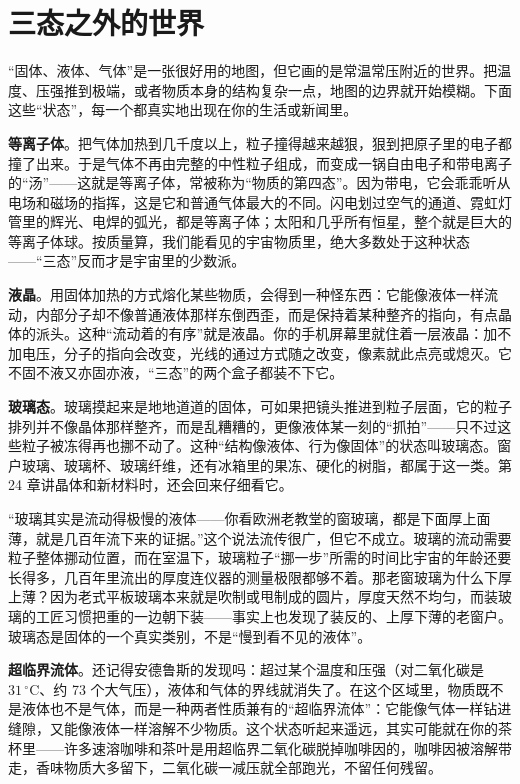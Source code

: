 \section{三态之外的世界}

“固体、液体、气体”是一张很好用的地图，但它画的是常温常压附近的世界。把温度、压强推到极端，或者物质本身的结构复杂一点，地图的边界就开始模糊。下面这些“状态”，每一个都真实地出现在你的生活或新闻里。

\textbf{等离子体}。把气体加热到几千度以上，粒子撞得越来越狠，狠到把原子里的电子都撞了出来。于是气体不再由完整的中性粒子组成，而变成一锅自由电子和带电离子的“汤”——这就是等离子体，常被称为“物质的第四态”。因为带电，它会乖乖听从电场和磁场的指挥，这是它和普通气体最大的不同。闪电划过空气的通道、霓虹灯管里的辉光、电焊的弧光，都是等离子体；太阳和几乎所有恒星，整个就是巨大的等离子体球。按质量算，我们能看见的宇宙物质里，绝大多数处于这种状态——“三态”反而才是宇宙里的少数派。

\textbf{液晶}。用固体加热的方式熔化某些物质，会得到一种怪东西：它能像液体一样流动，内部分子却不像普通液体那样东倒西歪，而是保持着某种整齐的指向，有点晶体的派头。这种“流动着的有序”就是液晶。你的手机屏幕里就住着一层液晶：加不加电压，分子的指向会改变，光线的通过方式随之改变，像素就此点亮或熄灭。它不固不液又亦固亦液，“三态”的两个盒子都装不下它。

\textbf{玻璃态}。玻璃摸起来是地地道道的固体，可如果把镜头推进到粒子层面，它的粒子排列并不像晶体那样整齐，而是乱糟糟的，更像液体某一刻的“抓拍”——只不过这些粒子被冻得再也挪不动了。这种“结构像液体、行为像固体”的状态叫玻璃态。窗户玻璃、玻璃杯、玻璃纤维，还有冰箱里的果冻、硬化的树脂，都属于这一类。第 24 章讲晶体和新材料时，还会回来仔细看它。

\begin{wuqu}
“玻璃其实是流动得极慢的液体——你看欧洲老教堂的窗玻璃，都是下面厚上面薄，就是几百年流下来的证据。”这个说法流传很广，但它不成立。玻璃的流动需要粒子整体挪动位置，而在室温下，玻璃粒子“挪一步”所需的时间比宇宙的年龄还要长得多，几百年里流出的厚度连仪器的测量极限都够不着。那老窗玻璃为什么下厚上薄？因为老式平板玻璃本来就是吹制或甩制成的圆片，厚度天然不均匀，而装玻璃的工匠习惯把重的一边朝下装——事实上也发现了装反的、上厚下薄的老窗户。玻璃态是固体的一个真实类别，不是“慢到看不见的液体”。
\end{wuqu}

\textbf{超临界流体}。还记得安德鲁斯的发现吗：超过某个温度和压强（对二氧化碳是 $31\,^{\circ}\mathrm{C}$、约 73 个大气压），液体和气体的界线就消失了。在这个区域里，物质既不是液体也不是气体，而是一种两者性质兼有的“超临界流体”：它能像气体一样钻进缝隙，又能像液体一样溶解不少物质。这个状态听起来遥远，其实可能就在你的茶杯里——许多速溶咖啡和茶叶是用超临界二氧化碳脱掉咖啡因的，咖啡因被溶解带走，香味物质大多留下，二氧化碳一减压就全部跑光，不留任何残留。

